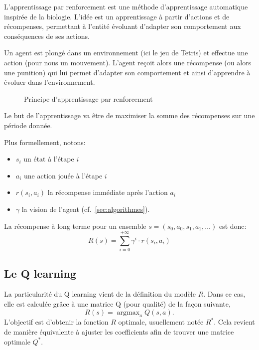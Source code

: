 \documentclass{report}
\DeclareMathOperator{\argmax}{argmax}
\begin{document}
L'apprentissage par renforcement est une méthode d'apprentissage automatique
inspirée de la biologie. L'idée est un apprentissage à partir d'actions et
de récompenses, permettant à l'entité évoluant d'adapter son comportement aux
conséquences de ses actions.

Un agent est plongé dans un environnement (ici le jeu de Tetris) et effectue une
action (pour nous un mouvement). L'agent reçoit alors une récompense (ou alors
une punition) qui lui permet d'adapter son comportement et ainsi d'apprendre à
évoluer dans l'environnement.

\begin{figure}[h]
    \begin{center}
    \end{center}

    \caption{Principe d'apprentissage par renforcement}
    \label{}
\end{figure}

Le but de l'apprentissage va être de maximiser la somme des récompenses sur une
période donnée.

Plus formellement, notons:
\begin{itemize}
    \item \( s_i \) un état à l'étape \( i \)
    \item \( a_i \) une action jouée à l'étape \( i \)
    \item \( r(s_i, a_i) \) la récompense immédiate après l'action \( a_i \)
    \item \( \gamma \) la vision de l'agent (cf.~\ref{sec:algorithmes}).
\end{itemize}

La récompense à long terme pour un ensemble
\( s = (s_0, a_0, s_1, a_1, \hdots) \) est donc:
\[
  R(s) = \sum_{i=0}^{+\infty}\gamma^i \cdot r(s_i, a_i)
\]


\subsection{Le Q learning}
La particularité du Q learning vient de la définition du modèle \(R\). Dans ce
cas, elle est calculée grâce à une matrice Q (pour qualité) de la façon
suivante,
\[
  R(s) = \argmax_{a} Q(s,a).
\]
L'objectif est d'obtenir la fonction \(R\) optimale, usuellement notée
\(R^*\). Cela revient de manière équivalente à ajuster les coefficients afin de
trouver une matrice optimale \(Q^*\).
\end{document}

